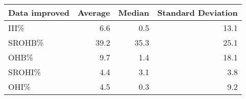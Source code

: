 \begin{tabular}{|l|r|r|r|}
\hline
 Data improved   &   Average &   Median &   Standard Deviation \\
\hline
 III\%            &       6.6 &      0.5 &                 13.1 \\
\hline
 SROHB\%          &      39.2 &     35.3 &                 25.1 \\
\hline
 OHB\%            &       9.7 &      1.4 &                 18.1 \\
\hline
 SROHI\%          &       4.4 &      3.1 &                  3.8 \\
\hline
 OHI\%            &       4.5 &      0.3 &                  9.2 \\
\hline
\end{tabular}
